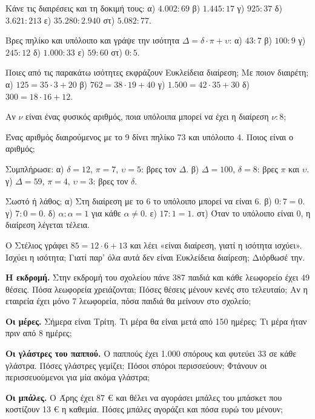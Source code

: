 

\ex Κάνε τις διαιρέσεις και τη δοκιμή τους: α) $4.002:69$ \quad β) $1.445:17$ \quad γ) $925:37$ \quad δ) $3.621:213$ \quad ε) $35.280:2.940$ \quad στ) $5.082:77$.

\ex Βρες πηλίκο και υπόλοιπο και γράψε την ισότητα $\Delta=\delta\cdot\pi+\upsilon$: α) $43:7$ \quad β) $100:9$ \quad γ) $245:12$ \quad δ) $1.000:33$ \quad ε) $59:60$ \quad στ) $0:5$.

\ex Ποιες από τις παρακάτω ισότητες εκφράζουν Ευκλείδεια διαίρεση; Με ποιον διαιρέτη; α) $125=35\cdot 3+20$ \quad β) $762=38\cdot 19+40$ \quad γ) $1.500=42\cdot 35+30$ \quad δ) $300=18\cdot 16+12$.

\ex Αν $\nu$ είναι ένας φυσικός αριθμός, ποια υπόλοιπα μπορεί να έχει η διαίρεση $\nu:8$;

\ex Ένας αριθμός διαιρούμενος με το 9 δίνει πηλίκο 73 και υπόλοιπο 4. Ποιος είναι ο αριθμός;

\ex Συμπλήρωσε: α) $\delta=12$, $\pi=7$, $\upsilon=5$: βρες τον $\Delta$. \quad β) $\Delta=100$, $\delta=8$: βρες $\pi$ και $\upsilon$. \quad γ) $\Delta=59$, $\pi=4$, $\upsilon=3$: βρες τον $\delta$.

\ex Σωστό ή λάθος; α) Στη διαίρεση με το 6 το υπόλοιπο μπορεί να είναι 6. \quad β) $0:7=0$. \quad γ) $7:0=0$. \quad δ) $\alpha:\alpha=1$ για κάθε $\alpha\neq 0$. \quad ε) $17:1=1$. \quad στ) Όταν το υπόλοιπο είναι 0, η διαίρεση λέγεται τέλεια.

\ex Ο Στέλιος γράφει $85=12\cdot 6+13$ και λέει «είναι διαίρεση, γιατί η ισότητα ισχύει». Ισχύει η ισότητα; Γιατί παρ' όλα αυτά δεν είναι Ευκλείδεια διαίρεση; Διόρθωσέ την.


\ex \textbf{Η εκδρομή.} Στην εκδρομή του σχολείου πάνε 387 παιδιά και κάθε λεωφορείο έχει 49 θέσεις. Πόσα λεωφορεία χρειάζονται; Πόσες θέσεις μένουν κενές στο τελευταίο; Αν η εταιρεία έχει μόνο 7 λεωφορεία, πόσα παιδιά θα μείνουν στο σχολείο;

\ex \textbf{Οι μέρες.} Σήμερα είναι Τρίτη. Τι μέρα θα είναι μετά από 150 ημέρες; Τι μέρα ήταν πριν από 8 ημέρες;

\ex \textbf{Οι γλάστρες του παππού.} Ο παππούς έχει 1.000 σπόρους και φυτεύει 33 σε κάθε γλάστρα. Πόσες γλάστρες γεμίζει; Πόσοι σπόροι περισσεύουν; Φτάνουν οι περισσευούμενοι για μία ακόμα γλάστρα;

\ex \textbf{Οι μπάλες.} Ο Άρης έχει 87 € και θέλει να αγοράσει μπάλες του μπάσκετ που κοστίζουν 13 € η καθεμία. Πόσες μπάλες αγοράζει και πόσα ευρώ του μένουν;

